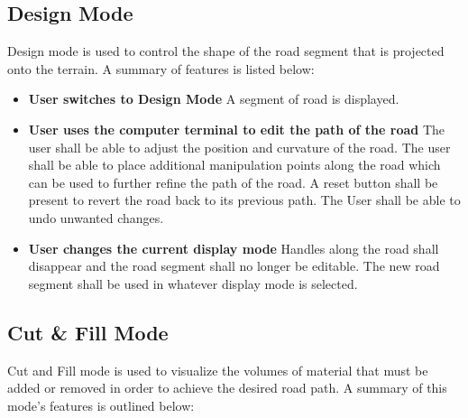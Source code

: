\documentclass[onecolumn, draftclsnofoot,10pt, compsoc]{IEEEtran}
\begin{document}
\subsection{Design Mode}
Design mode is used to control the shape of the road segment that is projected onto the terrain. A summary of features is listed below:

\begin{itemize}
\item \textbf{User switches to Design Mode}
A segment of road is displayed.

\item \textbf{User uses the computer terminal to edit the path of the road}
The user shall be able to adjust the position and curvature of the road.
The user shall be able to place additional manipulation points along the road which can be used to further refine the path of the road.
A reset button shall be present to revert the road back to its previous path.
The User shall be able to undo unwanted changes.

\item \textbf{User changes the current display mode}
Handles along the road shall disappear and the road segment shall no longer be editable.
The new road segment shall be used in whatever display mode is selected.
\end{itemize}

\subsection{Cut \& Fill Mode}
Cut and Fill mode is used to visualize the volumes of material that must be added or removed in order to achieve the desired road path. A summary of this mode's features is outlined below:
\end{document}
